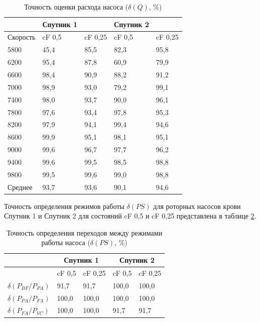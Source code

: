 \begin{table} [htbp]%
    \centering
	\caption{Точность оценки расхода насоса ($\delta(Q)$, \%)}%
	\label{tbl:sputnik_model_errors_05}%
    \renewcommand{\arraystretch}{1.5} 
	\begin{tabular}{@{}@{\extracolsep{20pt}}lllll@{}} 
        \toprule     %
    	 & Спутник 1 & & Спутник 2 & \\
        \midrule %
    	Скорость & cF 0,5 & cF 0,25 & cF 0,5 & cF 0,25 \\
		\midrule
		5800 & 45,4	 & 85,5 & 82,3 & 95,8 \\
		6200 & 95,4 & 87,8 & 60,9 & 79,9 \\
    	6600 & 98,4 & 90,9 & 88,2 & 91,2 \\
		7000 & 98,9 & 93,0 & 79,2 & 99,1 \\
    	7400 & 98,0 & 93,7 & 90,0 & 96,1 \\
		7800 & 97,6 & 93,4 & 97,8 & 95,3 \\
		8200 & 97,9 & 94,1 & 99,4 & 94,6 \\
		8600 & 99,9 & 95,1 & 98,1 & 95,1 \\
		9000 & 99,6 & 96,7 & 97,7 & 96,2 \\
		9400 & 99,6 & 99,5 & 98,5 & 98,8 \\
		9800 & 99,5 & 99,6 & 99,0 & 98,8 \\
		\midrule
		Среднее & 93,7 & 93,6 & 90,1 & 94,6 \\
        \bottomrule %
	\end{tabular}%
\end{table}

Точность определения режимов работы $\delta(PS)$ для роторных насосов крови Спутник 1 и Спутник 2 для состояний cF 0,5 и cF 0,25 представлена в таблице \ref{tbl:sputnik_ps_identification_accuracy}. 

\begin{table} [htbp]%
    \centering
	\caption{Точность определения переходов между режимами работы насоса ($\delta(PS)$, \%)}%
	\label{tbl:sputnik_ps_identification_accuracy}%
    \renewcommand{\arraystretch}{1.5} 
	\begin{tabular}{@{}@{\extracolsep{20pt}}lllll@{}} 
	\toprule
	& \multicolumn{2}{c}{Спутник 1} & \multicolumn{2}{c}{Спутник 2} \\
	\midrule
				&	cF 0,5	& cF 0,25 &	cF 0,5 & cF 0,25\\
	\midrule
	$\delta(P_{BF}/P_{PA})$		& 91,7			&	91,7			& 100,0		& 100,0\\
	$\delta(P_{PA}/P_{FA})$		& 100,0		&	100,0		& 100,0		& 100,0\\
	$\delta(P_{FA}/P_{VC})$		& 	100,0		&	100,0		& 91,7		& 91,7\\
	\bottomrule
	\end{tabular}%
\end{table}

